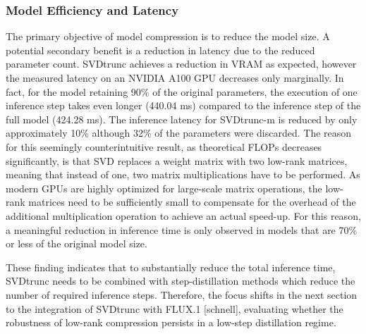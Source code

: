 \subsubsection{Model Efficiency and Latency}
The primary objective of model compression is to reduce the model size. A potential secondary benefit is a reduction in latency due to the reduced parameter count. \gls{SVD}trunc achieves a reduction in \gls{VRAM} as expected, however the measured latency on an NVIDIA A100 GPU decreases only marginally. In fact, for the model retaining 90\% of the original parameters, the execution of one inference step takes even longer (440.04 ms) compared to the inference step of the full model (424.28 ms). The inference latency for \gls{SVD}trunc-m is reduced by only approximately 10\% although 32\% of the parameters were discarded. The reason for this seemingly counterintuitive result, as theoretical FLOPs decreases significantly, is that \gls{SVD} replaces a weight matrix with two low-rank matrices, meaning that instead of one, two matrix multiplications have to be performed. As modern GPUs are highly optimized for large-scale matrix operations, the low-rank matrices need to be sufficiently small to compensate for the overhead of the additional multiplication operation to achieve an actual speed-up. For this reason, a meaningful reduction in inference time is only observed in models that are 70\% or less of the original model size. 

These finding indicates that to substantially reduce the total inference time, \gls{SVD}trunc needs to be combined with step-distillation methods which reduce the number of required inference steps. Therefore, the focus shifts in the next section to the integration of \gls{SVD}trunc with FLUX.1 {[schnell]}, evaluating whether the robustness of low-rank compression persists in a low-step distillation regime.


